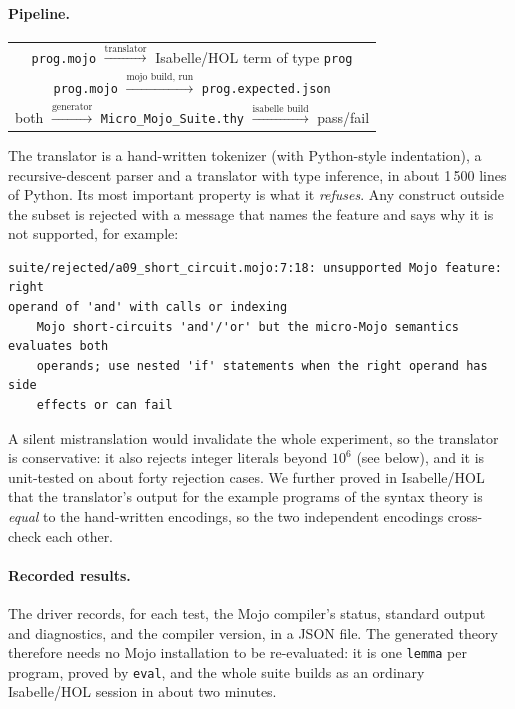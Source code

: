 \documentclass[11pt,a4paper]{article}
\newcommand{\IHOL}{Isabelle/HOL}
\newcommand{\code}[1]{\texttt{#1}}
\begin{document}
\paragraph{Pipeline.}
\begin{center}
\small
\begin{tabular}{c}
\code{prog.mojo} $\xrightarrow{\text{translator}}$ \IHOL{} term of type \code{prog}\\[0.3em]
\code{prog.mojo} $\xrightarrow{\text{mojo build, run}}$ \code{prog.expected.json}\\[0.3em]
both $\xrightarrow{\text{generator}}$ \code{Micro\_Mojo\_Suite.thy}
$\xrightarrow{\text{isabelle build}}$ pass/fail
\end{tabular}
\end{center}
The translator is a hand-written tokenizer (with Python-style indentation), a
recursive-descent parser and a translator with type inference, in about 1\,500
lines of Python. Its most important property is what it \emph{refuses}. Any
construct outside the subset is rejected with a message that names the
feature and says why it is not supported, for example:
\begin{lstlisting}[style=out]
suite/rejected/a09_short_circuit.mojo:7:18: unsupported Mojo feature: right
operand of 'and' with calls or indexing
    Mojo short-circuits 'and'/'or' but the micro-Mojo semantics evaluates both
    operands; use nested 'if' statements when the right operand has side
    effects or can fail
\end{lstlisting}
A silent mistranslation would invalidate the whole experiment, so the
translator is conservative: it also rejects integer literals beyond $10^6$
(see below), and it is unit-tested on about forty rejection cases. We further
proved in \IHOL{} that the translator's output for the example programs of the
syntax theory is \emph{equal} to the hand-written encodings, so the two
independent encodings cross-check each other.

\paragraph{Recorded results.}
The driver records, for each test, the Mojo compiler's status, standard output and
diagnostics, and the compiler version, in a JSON file. The generated theory
therefore needs no Mojo installation to be re-evaluated: it is one \code{lemma}
per program, proved by \code{eval}, and the whole suite builds as an ordinary
\IHOL{} session in about two minutes.
\end{document}
